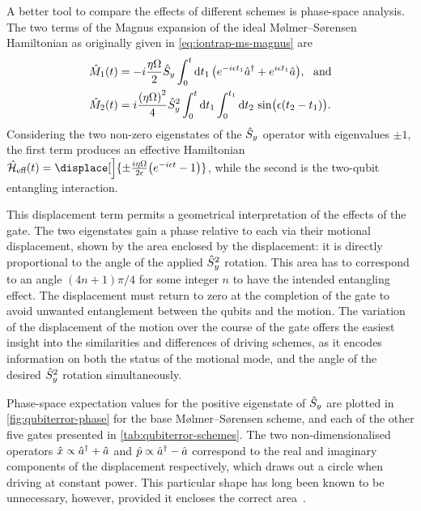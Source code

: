 A better tool to compare the effects of different schemes is phase-space analysis.
The two terms of the Magnus expansion of the ideal M\o lmer--S\o rensen Hamiltonian as originally given in \cref{eq:iontrap-ms-magnus} are
\begin{equation}\label{eq:qubiterror-ms-magnus}\begin{aligned}
\op M_1(t) &= -i \frac{\eta\Omega}2 \Sy\int_0^t\mathrm dt_1\,\bigl(e^{-i\epsilon t_1}\a^\dagger + e^{i\epsilon t_1}\a\bigr),\ \ \text{and}\\
\op M_2(t) &= i\frac{{(\eta\Omega)}^2}4 \Sy^2\int_0^t\mathrm dt_1\int_0^{t_1}\mathrm dt_2\,\sin\bigl(\epsilon(t_2-t_1)\bigr).
\end{aligned}\end{equation}
Considering the two non-zero eigenstates of the $\hat{S}_y$ operator with eigenvalues $\pm1$, the first term produces an effective Hamiltonian $\H_{\text{eff}}(t) = \displace[\Big]{\pm\frac{i\eta\Omega}{2\epsilon} \bigl(e^{-i\epsilon t} - 1\bigr)}$, while the second is the two-qubit entangling interaction.

This displacement term permits a geometrical interpretation of the effects of the gate.
The two eigenstates gain a phase relative to each via their motional displacement, shown by the area enclosed by the displacement: it is directly proportional to the angle of the applied $\hat{S}_y^2$ rotation.
This area has to correspond to an angle $(4n + 1)\pi/4$ for some integer $n$ to have the intended entangling effect.
The displacement must return to zero at the completion of the gate to avoid unwanted entanglement between the qubits and the motion.
The variation of the displacement of the motion over the course of the gate offers the easiest insight into the similarities and differences of driving schemes, as it encodes information on both the status of the motional mode, and the angle of the desired $\hat{S}_y^2$ rotation simultaneously.

Phase-space expectation values for the positive eigenstate of $\hat{S}_y$ are plotted in \cref{fig:qubiterror-phase} for the base M\o lmer--S\o rensen scheme, and each of the other five gates presented in \cref{tab:qubiterror-schemes}.
The two non-dimensionalised operators $\hat{x} \propto \hat{a}^\dagger + \hat{a}$ and $\hat{p} \propto \hat{a}^\dagger - \hat{a}$ correspond to the real and imaginary components of the displacement respectively, which draws out a circle when driving at constant power.
This particular shape has long been known to be unnecessary, however, provided it encloses the correct area~\cite{Milburn2000,Sorensen2000}.

